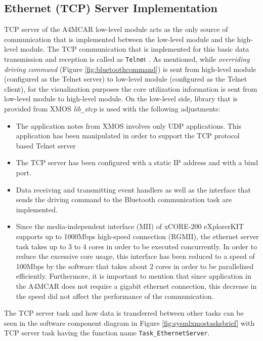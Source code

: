 \subsection{Ethernet (TCP) Server Implementation} \label{llethsection}
TCP server of the A4MCAR low-level module acts as the only source of communication that is implemented between the low-level module and the high-level module. The TCP communication that is implemented for this basic data transmission and reception is called as \texttt{Telne}t \cite{telnet}. As mentioned, while \textit{overriding driving command} (Figure \ref{fig:bluetoothcommand}) is sent from high-level module (configured as the Telnet server) to low-level module (configured as the Telnet client), for the visualization purposes the core utilization information is sent from low-level module to high-level module. On the low-level side, library that is provided from XMOS \textit{lib\texttt{\_}xtcp} is used with the following adjustments:
\begin{itemize}
	\item The application notes from XMOS involves only UDP applications. This application has been manipulated in order to support the TCP protocol based Telnet server
	\item The TCP server has been configured with a static IP address and with a bind port.
	\item Data receiving and transmitting event handlers as well as the interface that sends the driving command to the Bluetooth communication task are implemented.
	\item Since the media-independent interface (MII) of xCORE-200 eXplorerKIT supports up to 1000Mbps high-speed connection (RGMII), the ethernet server task takes up to 3 to 4 cores in order to be executed concurrently. In order to reduce the excessive core usage, this interface has been reduced to a speed of 100Mbps by the software that takes about 2 cores in order to be parallelized efficiently. Furthermore, it is important to mention that since application in the A4MCAR does not require a gigabit ethernet connection, this decrease in the speed did not affect the performance of the communication.
\end{itemize}

The TCP server task and how data is transferred between other tasks can be seen in the software component diagram in Figure \ref{fig:sysmlxmostasksbrief} with TCP server task having the function name \texttt{Task\texttt{\_}EthernetServer}.


